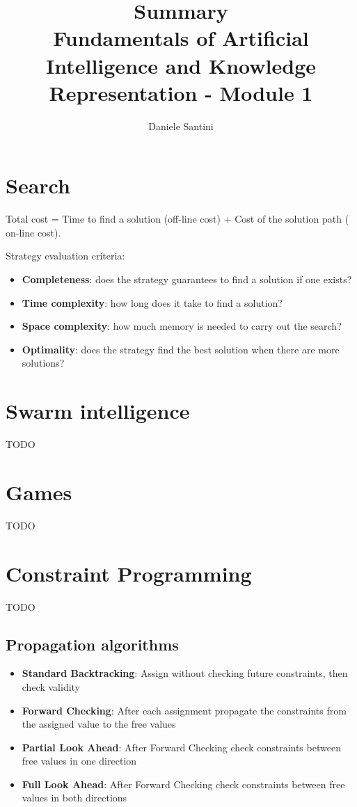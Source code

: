 \documentclass[]{article}
\title{Summary \\ \large Fundamentals of Artificial Intelligence and Knowledge Representation - Module 1}
\author{Daniele Santini}
\begin{document}

\section{Search}

Total cost = Time to find a solution (off-line cost) + Cost of the solution path (
on-line cost).

Strategy evaluation criteria:
\begin{itemize}
	\item \textbf{Completeness}: does the strategy guarantees to find a solution if one exists?
	\item \textbf{Time complexity}: how long does it take to find a solution?
	\item \textbf{Space complexity}: how much memory is needed to carry out the search?
	\item \textbf{Optimality}: does the strategy find the best solution when there are more solutions?
\end{itemize}

\section{Swarm intelligence}

TODO

\section{Games}

TODO

\section{Constraint Programming}

TODO

\subsection{Propagation algorithms}

\begin{itemize}
	\item \textbf{Standard Backtracking}: Assign without checking future constraints, then check validity
	\item \textbf{Forward Checking}: After each assignment propagate the constraints from the assigned value to the free values
	\item \textbf{Partial Look Ahead}: After Forward Checking check constraints between free values in one direction
	\item \textbf{Full Look Ahead}: After Forward Checking check constraints between free values in both directions
\end{itemize}
\end{document}
